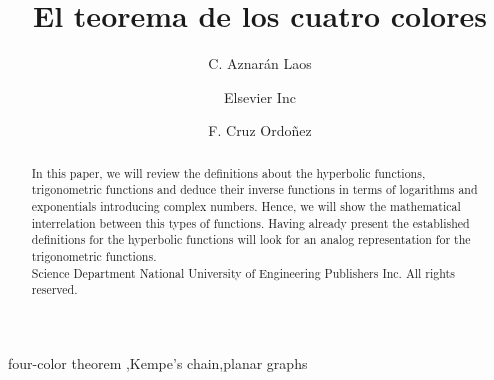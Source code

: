 \documentclass[3p,times,a4paper,twocolumn,authoryear]{elsarticle} %
\begin{document}
\begin{frontmatter}

\title{El teorema de los cuatro colores}
\author{C. Aznarán Laos}
\address{Radarweg 29, Amsterdam}

\author[unim]{Elsevier Inc}

\author[unic]{F. Cruz Ordoñez}

\address[unim]{Facultad de Ciencias - Escuela profesional de Matemática, \\Universidad Nacional de Ingeniería,	Av. Túpac Amaru 210, Rímac, Lima 25, Peru}
\address[unic]{Facultad de Ciencias - Escuela profesional de Ciencia de la Computación, \\Universidad Nacional de Ingeniería,	Av. Túpac Amaru 210, Rímac, Lima 25, Peru}

%
\begin{abstract}
In this paper, we will review the definitions about the hyperbolic functions, trigonometric functions and deduce their inverse functions in terms of logarithms and exponentials introducing complex numbers.
Hence, we will show the mathematical interrelation between this types of functions.
Having already present the established definitions for the hyperbolic functions will look for an analog representation for the trigonometric functions.%
\\[0.2cm]
\textcopyright \hspace{.1cm}Science Department National University of Engineering Publishers Inc. All rights reserved. 
\end{abstract}

\begin{keyword}
four-color theorem \sep Kempe's chain\sep planar graphs
\end{keyword}

\end{frontmatter}
\end{document}
